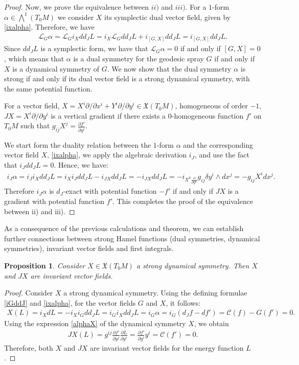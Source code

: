 \documentclass[oneside,english]{amsart}
\theoremstyle{definition}
\theoremstyle{plain}
\theoremstyle{plain}
\newtheorem{prop}[theorem]{Proposition}
\theoremstyle{plain}
\theoremstyle{remark}
\theoremstyle{remark}
\theoremstyle{remark}
\begin{document}
\begin{proof}
Now, we prove the equivalence between $ii)$ and $iii)$. For a $1$-form $\alpha\in \bigwedge^1(T_0M)$ we consider $X$ its symplectic dual vector field, given by \eqref{ixalpha}. Therefore, we have
\begin{eqnarray*} 
\mathcal{L}_G\alpha = \mathcal{L}_Gi_Xdd_JL=i_X\mathcal{L}_Gdd_JL +i_{[G,X]}dd_JL = i_{[G,X]}dd_JL. 
\end{eqnarray*}
Since $dd_JL$ is a symplectic form, we have that $\mathcal{L}_G\alpha=0$ if and only if $[G,X]=0$, which means that $\alpha$ is a dual symmetry for the geodesic spray $G$ if and only if $X$ is a dynamical symmetry of $G$. We now show that the dual symmetry $\alpha$ is strong if and only if its dual vector field is a strong dynamical symmetry, with the same potential function. 

For a vector field, $X=X^i{\partial}/{\partial x^i} + Y^i{\partial}/{\partial y^i}\in \mathfrak{X}(T_0M)$, homogeneous of order $-1$, $JX=X^i{\partial}/{\partial y^i}$ is a vertical gradient if there exists a $0$-homogeneous function $f'$ on $T_0M$ such that $g_{ij}X^j=\frac{\partial f'}{\partial y^i}$. 

We start form the duality relation between the $1$-form $\alpha$ and the corresponding vector field $X$, \eqref{ixalpha}, we apply the algebraic derivation $i_J$, and use the fact that $i_Jdd_JL=0$. Hence, we have:
\begin{eqnarray*}
i_J\alpha=i_Ji_Xdd_JL=i_Xi_Jdd_JL - i_{JX}dd_JL=-i_{JX}dd_JL= - i_{X^k\frac{\partial}{\partial y^k}}g_{ij}\delta y^i\wedge dx^j = - g_{ij}X^idx^j.
\end{eqnarray*} 
Therefore $i_J\alpha$ is $d_J$-exact with potential function $-f'$ if and only if $JX$ is a gradient with potential function $f'$. This completes the proof of the equivalence between ii) and iii).   
\end{proof}

As a consequence of the previous calculations and theorem, we can establish further connections between strong Hamel functions (dual symmetries, dynamical symmetries), invariant vector fields and first integrals.

\begin{prop} \label{Noether}
Consider $X\in \mathfrak{X}(T_0M)$ a strong dynamical symmetry. Then $X$ and $JX$ are invariant vector fields.
\end{prop}
\begin{proof}
Consider $X$ a strong dynamical symmetry. Using the defining formulae \eqref{iGddJ} and \eqref{ixalpha}, for the vector fields $G$ and $X$, it follows:
\begin{eqnarray*}
X(L)=i_XdL = - i_Xi_Gdd_JL=i_Gi_Xdd_JL=i_G\alpha = i_G(d_Jf-df')=\mathcal{C}(f)-G(f')=0.
\end{eqnarray*}
Using the expression \eqref{alphaX} of the dynamical symmetry $X$, we obtain
\begin{eqnarray*}
JX(L)=g^{ij}\frac{\partial f'}{\partial y^j} \frac{\partial L}{\partial y^i} = \frac{\partial f'}{\partial y^i} y^i = \mathcal{C}(f')=0.
\end{eqnarray*}
Therefore, both $X$ and $JX$ are invariant vector fields for the energy function $L$.  
\end{proof}
\end{document}

